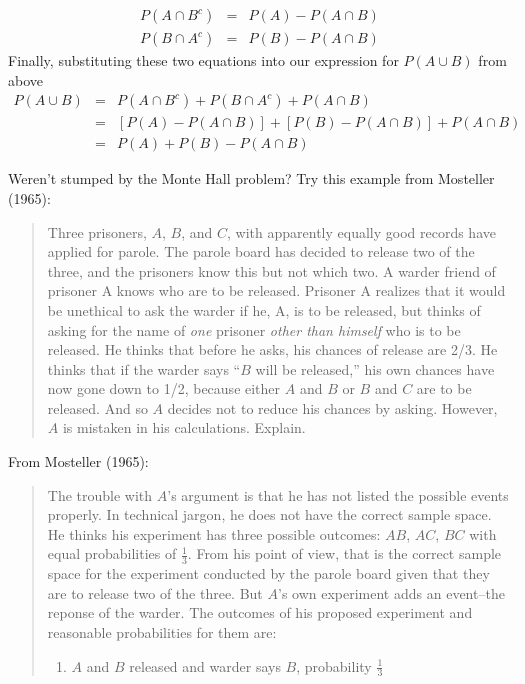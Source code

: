 \documentclass[addpoints,12pt]{exam}
\begin{document}
\begin{questions}
\begin{solution}
		\begin{eqnarray*}
			P(A\cap B^c)  &=&P(A) - P(A \cap B)\\
			P(B\cap A^c) &=& P(B)  - P(A \cap B)
		\end{eqnarray*}
Finally, substituting these two equations into our expression for $P(A\cup B)$ from above
	\begin{eqnarray*}
	P(A \cup B) &=& P(A \cap B^c) + P(B \cap A^c) + P(A\cap B)\\
	&=& \left[P(A) - P(A \cap B)\right] + \left[P(B)  - P(A \cap B)\right] + P(A\cap B)\\
	&=& P(A) + P(B) - P(A \cap B)
	\end{eqnarray*}
		\end{solution}


\question Weren't stumped by the Monte Hall problem? Try this example from Mosteller (1965):
	\begin{quote}
	Three prisoners, $A$, $B$, and $C$, with apparently equally good records have applied for parole. The parole board has decided to release two of the three, and the prisoners know this but not which two. A warder friend of prisoner A knows who are to be released. Prisoner A realizes that it would be unethical to ask the warder if he, A, is to be released, but thinks of asking for the name of \emph{one} prisoner \emph{other than himself} who is to be released. He thinks that before he asks, his chances of release are 2/3. He thinks that if the warder says ``$B$ will be released,'' his own chances have now gone down to 1/2, because either $A$ and $B$ or $B$ and $C$ are to be released. And so $A$ decides not to reduce his chances by asking. However, $A$ is mistaken in his calculations. Explain.
	\end{quote}
	\begin{solution}
		From Mosteller (1965):
			\begin{quote}
				The trouble with $A$'s argument is that he has not listed the possible events properly. In technical jargon, he does not have the correct sample space. He thinks his experiment has three possible outcomes: $AB$, $AC$, $BC$ with equal probabilities of $\frac{1}{3}$. From his point of view, that is the correct sample space for the experiment conducted by the parole board given that they are to release two of the three. But $A$'s own experiment adds an event--the reponse of the warder. The outcomes of his proposed experiment and reasonable probabilities for them are:
				\begin{enumerate}
					\item $A$ and $B$ released and warder says $B$, probability $\frac{1}{3}$

\end{enumerate}
\end{quote}
\end{solution}
\end{questions}
\end{document}
